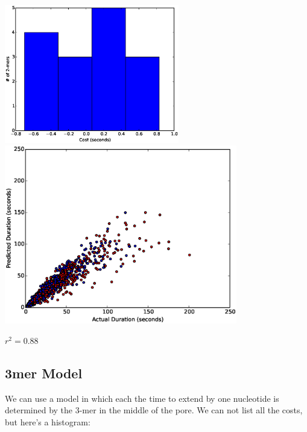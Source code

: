 \documentclass[11pt]{article}
\begin{document}
\includegraphics[width=3in]{part11hist2}\\
\includegraphics[width=4in]{part11scatter2mer}

$r^2=0.88$

\subsection*{3mer Model}

        We can use a model in which each the time to extend by one nucleotide is determined by the 3-mer in the middle of the
        pore.  We can not list all the costs, but here's a histogram:
        
\end{document}
